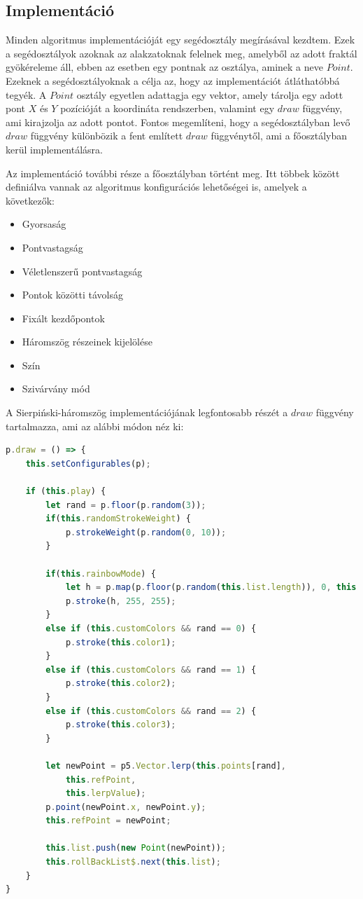 \subsection*{Implementáció}
Minden algoritmus implementációját egy segédosztály megírásával kezdtem. Ezek a segédosztályok azoknak az alakzatoknak felelnek meg, amelyből az adott fraktál gyökéreleme áll, ebben az esetben egy pontnak az osztálya, aminek a neve $Point$. Ezeknek a segédosztályoknak a célja az, hogy az implementációt átláthatóbbá tegyék. A $Point$ osztály egyetlen adattagja egy vektor, amely tárolja egy adott pont $X$ és $Y$ pozícióját a koordináta rendszerben, valamint egy $draw$ függvény, ami kirajzolja az adott pontot. Fontos megemlíteni, hogy a segédosztályban levő $draw$ függvény különbözik a fent említett $draw$ függvénytől, ami a főosztályban kerül implementálásra.
\par Az implementáció további része a főosztályban történt meg. Itt többek között definiálva vannak az algoritmus konfigurációs lehetőségei is, amelyek a következők:
\begin{itemize}
	\item Gyorsaság
	\item Pontvastagság
	\item Véletlenszerű pontvastagság
	\item Pontok közötti távolság
	\item Fixált kezdőpontok
	\item Háromszög részeinek kijelölése
	\item Szín
	\item Szivárvány mód
\end{itemize}
A Sierpiński-háromszög implementációjának legfontosabb részét a $draw$ függvény tartalmazza, ami az alábbi módon néz ki:
\begin{lstlisting}[language=typescript]
p.draw = () => {
	this.setConfigurables(p);
	
	if (this.play) {
		let rand = p.floor(p.random(3));
		if(this.randomStrokeWeight) {
			p.strokeWeight(p.random(0, 10));
		}
	
		if(this.rainbowMode) {
			let h = p.map(p.floor(p.random(this.list.length)), 0, this.list.length, 0, 360);
			p.stroke(h, 255, 255);
		}
		else if (this.customColors && rand == 0) {
			p.stroke(this.color1);
		} 
		else if (this.customColors && rand == 1) {
			p.stroke(this.color2);
		} 
		else if (this.customColors && rand == 2) {
			p.stroke(this.color3);
		} 
	
		let newPoint = p5.Vector.lerp(this.points[rand], 
			this.refPoint, 
			this.lerpValue);
		p.point(newPoint.x, newPoint.y);
		this.refPoint = newPoint;
		
		this.list.push(new Point(newPoint));
		this.rollBackList$.next(this.list);
	}
}	
\end{lstlisting}
